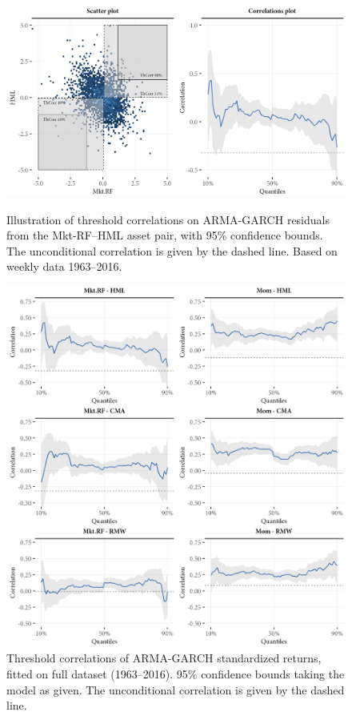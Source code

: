 \begin{figure}[!ht]
  \centering
  \footnotesize
  \caption{Illustration of threshold correlations on ARMA-GARCH residuals from the Mkt-RF--HML asset pair, with 95\% confidence bounds. The unconditional correlation is given by the dashed line. Based on weekly data 1963--2016.}
  \includegraphics[scale=1]{graphics/threshold_explain_res.png}
  \label{fig:illustrate_threshold}
\end{figure}

\begin{figure}[!ht]
  \centering
  \footnotesize
  \includegraphics[scale=1]{graphics/threshold1.png}

  \caption{Threshold correlations of ARMA-GARCH standardized returns, fitted on full dataset (1963--2016). 95\% confidence bounds taking the model as given. The unconditional correlation is given by the dashed line.}
  \label{fig:threshold1}
\end{figure}

